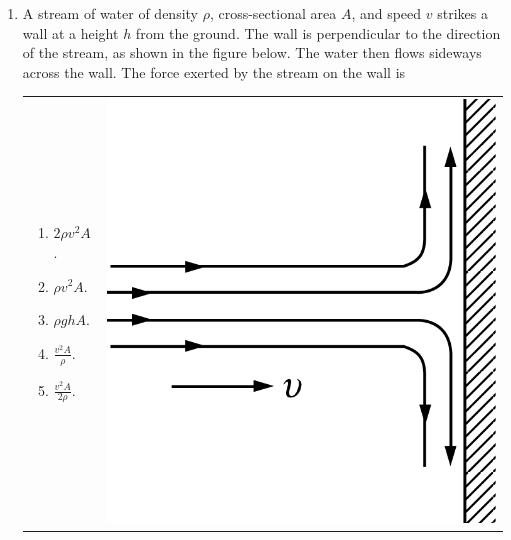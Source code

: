 \documentclass[12pt,letterpaper]{article}
\begin{document}
\begin{enumerate}
\item
A stream of water of density $\rho$, cross-sectional area $A$, and speed $v$ strikes a wall at a height $h$ from the ground. The wall is perpendicular to the direction of the stream, as shown in the figure below. The water then flows sideways across the wall. The force exerted by the stream on the wall is

\begin{tabular}{l r}

\begin{minipage}{0.7\textwidth}
\begin{enumerate}
\item $2\rho v^2A$.
\item $\rho v^2A$.
\item $\rho ghA$.
\item $\displaystyle \frac{v^2A}{\rho}$.
\item $\displaystyle \frac{v^2A}{2\rho}$.
\end{enumerate}
\end{minipage} &
\begin{minipage}{0.2\textwidth}
\includegraphics[width=\textwidth]{stream.png}
\end{minipage}
\end{tabular}


\end{enumerate}
\end{document}
